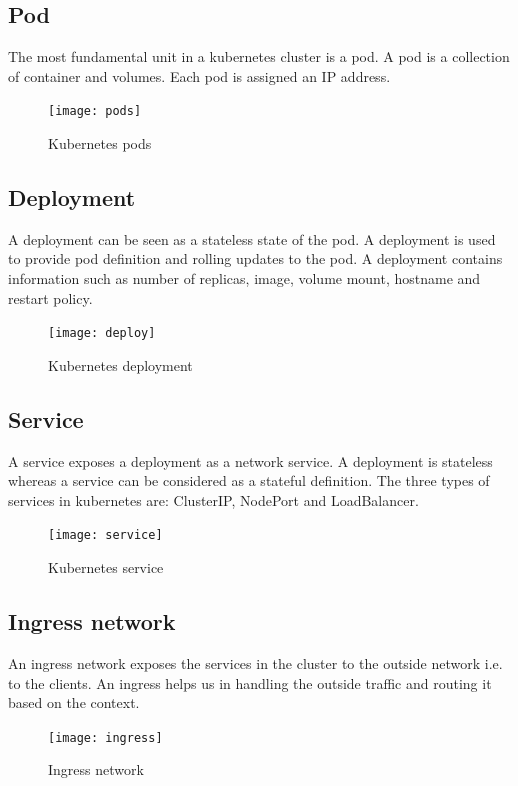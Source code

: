 \documentclass[12pt]{report}
\begin{document}
\subsection{Pod}
The most fundamental unit in a kubernetes cluster is a pod. A pod is a collection of container and volumes. Each pod is assigned an IP address.\\
\begin{figure}[h!]
	\begin{center}
		\texttt{[image: pods]}
		\caption{Kubernetes pods \cite{Pods}}
	\end{center}
\end{figure}
\subsection{Deployment}
A deployment can be seen as a stateless state of the pod. A deployment is used to provide pod definition and rolling updates to the pod. A deployment contains information such as number of replicas, image, volume mount, hostname and restart policy.\\
\begin{figure}[h!]
	\begin{center}
		\texttt{[image: deploy]}
		\caption{Kubernetes deployment \cite{Deployments}}
	\end{center}
\end{figure}
\subsection{Service}
A service exposes a deployment as a network service. A deployment is stateless whereas a service can be considered as a stateful definition. The three types of services in kubernetes are: ClusterIP, NodePort and LoadBalancer.\\
\begin{figure}[h!]
	\begin{center}
		\texttt{[image: service]}
		\caption{Kubernetes service \cite{Service}}
	\end{center}
\end{figure}
\subsection{Ingress network}
An ingress network exposes the services in the cluster to the outside network i.e. to the clients. An ingress helps us in handling the outside traffic and routing it based on the context.\\
\begin{figure}[h!]
	\begin{center}
		\texttt{[image: ingress]}
		\caption{Ingress network \cite{Ingress}}
	\end{center}
\end{figure}
\end{document}
